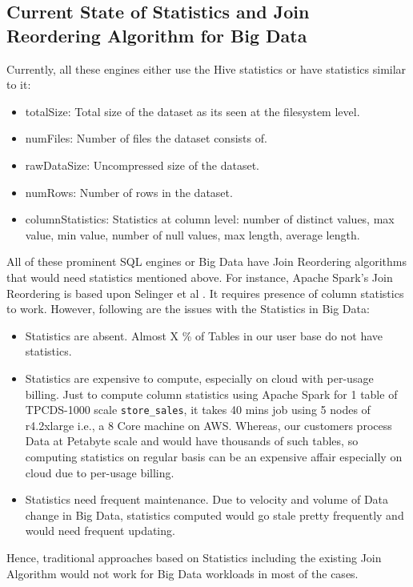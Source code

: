 \subsection{Current State of Statistics and Join Reordering Algorithm for Big Data}

Currently, all these engines either use the Hive statistics or have statistics similar to it:
\begin{itemize}
\item totalSize: Total size of the dataset as its seen at the filesystem level.
\item numFiles: Number of files the dataset consists of.
\item rawDataSize: Uncompressed size of the dataset.
\item numRows: Number of rows in the dataset.
\item columnStatistics: Statistics at column level: number of distinct values, max value, min value, number of null values, max length, average length.
\end{itemize}

All of these prominent SQL engines or Big Data have Join Reordering algorithms that would need statistics mentioned above. For instance, Apache Spark's Join Reordering is based upon Selinger et al \cite{b1}. It requires presence of column statistics to work. However, following are the issues with the Statistics in Big Data:

\begin{itemize}
\item Statistics are absent. Almost X \% of Tables in our user base do not have statistics.
\item Statistics are expensive to compute, especially on cloud with per-usage billing. Just to compute column statistics using Apache Spark for 1 table of TPCDS-1000 scale \texttt{store\_sales}, it takes 40 mins job using 5 nodes of r4.2xlarge i.e., a 8 Core machine on AWS. Whereas, our customers process Data at Petabyte scale and would have thousands of such tables, so computing statistics on regular basis can be an expensive affair especially on cloud due to per-usage billing.
\item Statistics need frequent maintenance. Due to velocity and volume of Data change in Big Data, statistics computed would go stale pretty frequently and would need frequent updating.
\end{itemize}


Hence, traditional approaches based on Statistics including the existing Join Algorithm would not work for Big Data workloads in most of the cases.